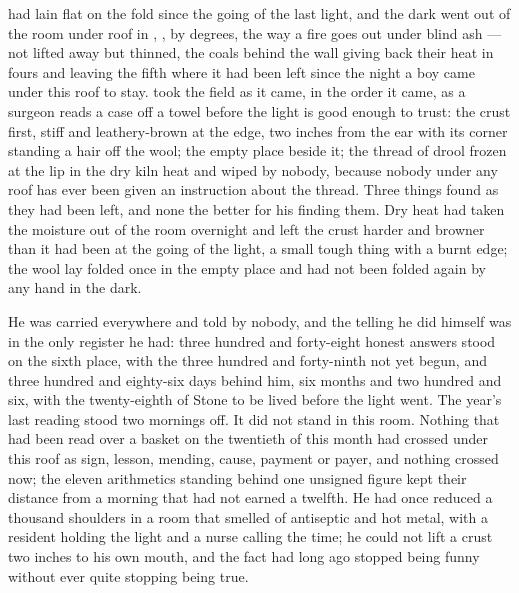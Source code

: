 
 had lain flat on the fold since the going of the last light, and the dark went out of the room under  roof in , ,  by degrees, the way a fire goes out under blind ash --- not lifted away but thinned, the coals behind the wall giving back their heat in fours and leaving the fifth where it had been left since the night a boy came under this roof to stay.  took the field as it came, in the order it came, as a surgeon reads a case off a towel before the light is good enough to trust: the crust first, stiff and leathery-brown at the edge, two inches from the ear with its corner standing a hair off the wool; the empty place beside it; the thread of drool frozen at the lip in the dry kiln heat and wiped by nobody, because nobody under any roof has ever been given an instruction about the thread. Three things found as they had been left, and none the better for his finding them. Dry heat had taken the moisture out of the room overnight and left the crust harder and browner than it had been at the going of the light, a small tough thing with a burnt edge; the wool lay folded once in the empty place and had not been folded again by any hand in the dark.

He was carried everywhere and told by nobody, and the telling he did himself was in the only register he had: three hundred and forty-eight honest answers stood on the sixth place, with the three hundred and forty-ninth not yet begun, and three hundred and eighty-six days behind him, six months and two hundred and six, with the twenty-eighth of Stone to be lived before the light went. The year's last reading stood two mornings off. It did not stand in this room. Nothing that had been read over a basket on the twentieth of this month had crossed under this roof as sign, lesson, mending, cause, payment or payer, and nothing crossed now; the eleven arithmetics standing behind one unsigned figure kept their distance from a morning that had not earned a twelfth. He had once reduced a thousand shoulders in a room that smelled of antiseptic and hot metal, with a resident holding the light and a nurse calling the time; he could not lift a crust two inches to his own mouth, and the fact had long ago stopped being funny without ever quite stopping being true.

